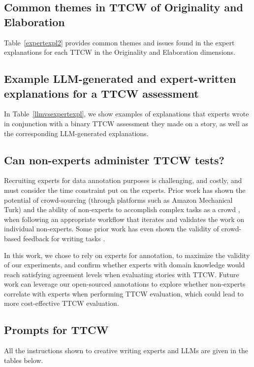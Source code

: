 \subsection{Common themes in TTCW of Originality and Elaboration}


Table~\ref{expertexpl2} provides common themes and issues found in the expert explanations for each TTCW in the Originality and Elaboration dimensions.


\subsection{Example LLM-generated and expert-written explanations for a TTCW assessment} 



In Table~\ref{llmvsexpertexpl}, we show examples of explanations that experts wrote in conjunction with a binary TTCW assessment they made on a story, as well as the corresponding LLM-generated explanations.

\subsection{Can non-experts administer TTCW tests?}

Recruiting experts for data annotation purposes is challenging, and costly, and must consider the time constraint put on the experts. Prior work has shown the potential of crowd-sourcing (through platforms such as Amazon Mechanical Turk) and the ability of non-experts to accomplish complex tasks as a crowd \cite{kittur2013future}, when following an appropriate workflow that iterates and validates the work on individual non-experts. Some prior work has even shown the validity of crowd-based feedback for writing tasks \cite{bernstein2010soylent,nebeling2016wearwrite}. 

In this work, we chose to rely on experts for annotation, to maximize the validity of our experiments, and confirm whether experts with domain knowledge would reach satisfying agreement levels when evaluating stories with TTCW. Future work can leverage our open-sourced annotations to explore whether non-experts correlate with experts when performing TTCW evaluation, which could lead to more cost-effective TTCW evaluation.

\subsection{Prompts for TTCW} \label{allprompts}

All the instructions shown to creative writing experts and LLMs are given in the tables below.


